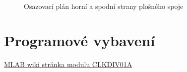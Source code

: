 \documentclass[12pt,a4paper,oneside]{article}
\begin{document}
\begin{figure} [h!tbp]
  \caption{Osazovací plán horní a spodní strany plošného spoje}
  \label{fig:osazovaci_plan}
\end{figure}

\section{Programové vybavení}

\begin{thebibliography}{99}
\href{http://wiki.mlab.cz/doku.php?id=cs:clkdiv}{MLAB wiki stránka modulu CLKDIV01A}

\end{thebibliography}
\end{document}
